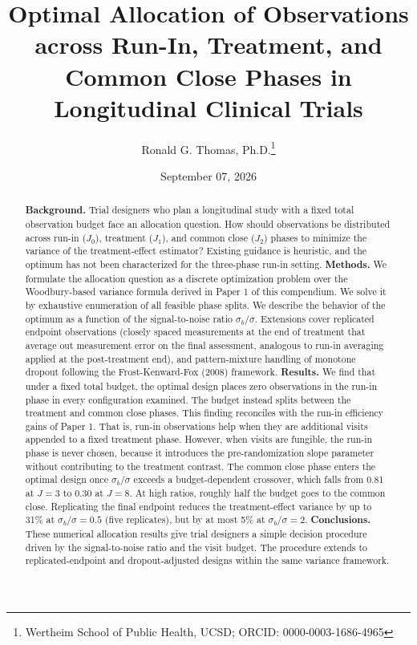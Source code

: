 \documentclass[
  11pt,
]{article}
\title{Optimal Allocation of Observations across Run-In,
Treatment, and Common Close Phases in Longitudinal
Clinical Trials}
\author{Ronald G. Thomas, Ph.D.\thanks{Wertheim School of Public Health, UCSD; ORCID: 0000-0003-1686-4965}}
\date{September 07, 2026}
\begin{document}
\maketitle
\begin{abstract}
\textbf{Background.} Trial designers who plan a longitudinal
study with a fixed total observation budget face an
allocation question. How should observations be distributed
across run-in (\(J_0\)), treatment (\(J_1\)), and common close
(\(J_2\)) phases to minimize the variance of the
treatment-effect estimator? Existing guidance is heuristic,
and the optimum has not been characterized for the
three-phase run-in setting.
\textbf{Methods.} We formulate the allocation question as a
discrete optimization problem over the Woodbury-based
variance formula derived in Paper 1 of this compendium. We
solve it by exhaustive enumeration of all feasible phase
splits. We describe the behavior of the optimum as a
function of the signal-to-noise ratio \(\sigma_b / \sigma\).
Extensions cover replicated endpoint observations (closely
spaced measurements at the end of treatment that average
out measurement error on the final assessment, analogous to
run-in averaging applied at the post-treatment end), and
pattern-mixture handling of monotone dropout following the
Frost-Kenward-Fox (2008) framework.
\textbf{Results.} We find that under a fixed total budget, the
optimal design places zero observations in the run-in phase
in every configuration examined. The budget instead splits
between the treatment and common close phases. This finding
reconciles with the run-in efficiency gains of Paper 1. That
is, run-in observations help when they are additional visits
appended to a fixed treatment phase. However, when visits
are fungible, the run-in phase is never chosen, because it
introduces the pre-randomization slope parameter without
contributing to the treatment contrast. The common close
phase enters the optimal design once \(\sigma_b / \sigma\)
exceeds a budget-dependent crossover, which falls from 0.81
at \(J=3\) to 0.30 at \(J=8\). At high ratios, roughly half the
budget goes to the common close. Replicating the final
endpoint reduces the treatment-effect variance by up to 31\%
at \(\sigma_b / \sigma = 0.5\) (five replicates), but by at
most 5\% at \(\sigma_b / \sigma = 2\).
\textbf{Conclusions.} These numerical allocation results give
trial designers a simple decision procedure driven by the
signal-to-noise ratio and the visit budget. The procedure
extends to replicated-endpoint and dropout-adjusted designs
within the same variance framework.
\end{abstract}
\end{document}
